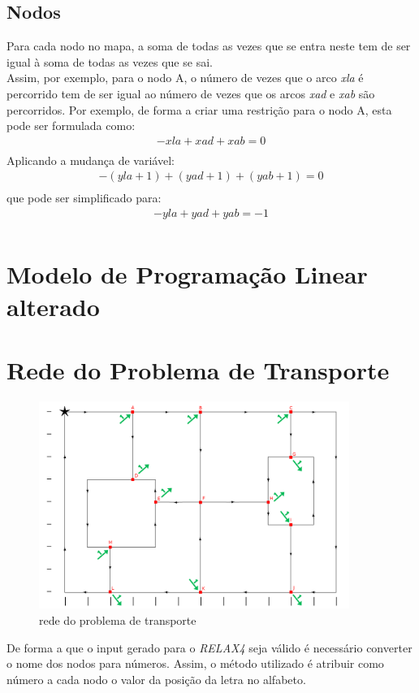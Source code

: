 \documentclass[a4paper]{report}
\begin{document}
\subsection{Nodos}
Para cada nodo no mapa, a soma de todas as vezes que se entra neste
tem de ser igual à soma de todas as vezes que se sai.\\
Assim, por exemplo, para o nodo A, o número de vezes que o arco \textit{xla} é
percorrido tem de ser igual ao número de vezes que os arcos \textit{xad} e
\textit{xab} são percorridos.
Por exemplo, de forma a criar uma restrição para o nodo A, esta pode ser
formulada como:\\
\begin{multline}
- xla + xad + xab = 0 \\
\end{multline}
Aplicando a mudança de variável:
\begin{multline}
- (yla + 1) + (yad +1) + (yab +1) = 0 \\
\end{multline}
que pode ser simplificado para:
\begin{multline}
- yla + yad + yab = -1\\
\end{multline}

\pagebreak
\section{Modelo de Programação Linear alterado}


\pagebreak
\section{Rede do Problema de Transporte}

\begin{figure}[H]
    \begin{center}
        \includegraphics[width=0.9\textwidth]{images/redeTransporte.png}\par
        \caption{rede do problema de transporte}
        \label{fig:redeTransporte}
    \end{center}
\end{figure}
De forma a que o input gerado para o \textit{RELAX4} seja válido é necessário
converter o nome dos nodos para números. Assim, o método utilizado é atribuir
como número a cada nodo o valor da posição da letra no alfabeto.
\end{document}
